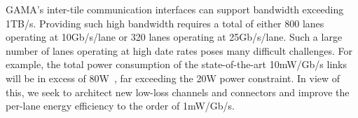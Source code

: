 \noindent
GAMA's inter-tile communication interfaces can support bandwidth exceeding 1TB/s.
Providing such high bandwidth requires a total of either 800 lanes operating at 10Gb/s/lane or 320 lanes operating at 25Gb/s/lane.  
Such a large number of lanes %
operating at high date rates poses many difficult challenges. 
For example, the total power consumption of the state-of-the-art 10mW/Gb/s links will be in excess of 80W~\cite{krishnaswamy2013bandwidth}, 
far exceeding the 20W power constraint.
In view of this, we seek to architect new low-loss channels and connectors and improve the per-lane energy efficiency to the order of 1mW/Gb/s. 



